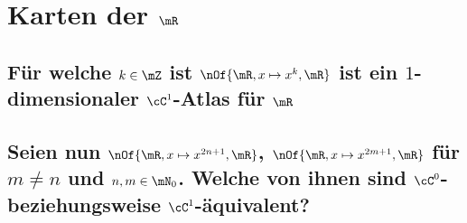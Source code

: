 \section{Karten der $\mR$}
\subsection{Für welche $k\in\mZ$ ist $\nOf{\mR,x\mapsto x^k,\mR}$ ist ein $1$-dimensionaler $\cC^1$-Atlas für $\mR$}


\subsection{Seien nun $\nOf{\mR,x\mapsto x^{2n+1},\mR}$, $\nOf{\mR,x\mapsto x^{2m+1},\mR}$ für $m\neq n$ und $n,m\in \mN_0$. Welche von ihnen sind $\cC^0$- beziehungsweise $\cC^1$-äquivalent?}